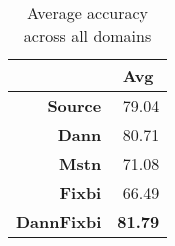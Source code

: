 \begin{table}[H]
\centering
\caption{Average accuracy across all domains}
\label{tab:tot_avg}
\begin{tabular}{|r|r|}
\hline
                          & \multicolumn{1}{c|}{Avg} \\ \hline
\textbf{Source}           & 79.04                    \\ \hline
\textbf{Dann}             & 80.71                    \\ \hline
\textbf{Mstn} & 71.08                    \\ \hline
\textbf{Fixbi}            & 66.49                    \\ \hline
\textbf{DannFixbi}        & \textbf{81.79}           \\ \hline
\end{tabular}
\end{table}


